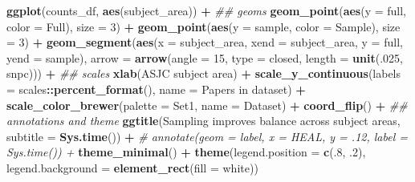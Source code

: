 \documentclass[
]{article}
\newenvironment{Shaded}{\begin{snugshade}}{\end{snugshade}}
\newcommand{\CommentTok}[1]{\textcolor[rgb]{0.56,0.35,0.01}{\textit{#1}}}
\newcommand{\DataTypeTok}[1]{\textcolor[rgb]{0.13,0.29,0.53}{#1}}
\newcommand{\DecValTok}[1]{\textcolor[rgb]{0.00,0.00,0.81}{#1}}
\newcommand{\FloatTok}[1]{\textcolor[rgb]{0.00,0.00,0.81}{#1}}
\newcommand{\KeywordTok}[1]{\textcolor[rgb]{0.13,0.29,0.53}{\textbf{#1}}}
\newcommand{\NormalTok}[1]{#1}
\newcommand{\OperatorTok}[1]{\textcolor[rgb]{0.81,0.36,0.00}{\textbf{#1}}}
\newcommand{\StringTok}[1]{\textcolor[rgb]{0.31,0.60,0.02}{#1}}
\begin{document}
\begin{Shaded}
\begin{Highlighting}[]
\KeywordTok{ggplot}\NormalTok{(counts\_df, }\KeywordTok{aes}\NormalTok{(subject\_area)) }\OperatorTok{+}\StringTok{ }
\StringTok{    }\CommentTok{\#\# geoms}
\StringTok{    }\KeywordTok{geom\_point}\NormalTok{(}\KeywordTok{aes}\NormalTok{(}\DataTypeTok{y =}\NormalTok{ full, }\DataTypeTok{color =} \StringTok{\textquotesingle{}Full\textquotesingle{}}\NormalTok{), }\DataTypeTok{size =} \DecValTok{3}\NormalTok{) }\OperatorTok{+}
\StringTok{    }\KeywordTok{geom\_point}\NormalTok{(}\KeywordTok{aes}\NormalTok{(}\DataTypeTok{y =}\NormalTok{ sample, }\DataTypeTok{color =} \StringTok{\textquotesingle{}Sample\textquotesingle{}}\NormalTok{), }\DataTypeTok{size =} \DecValTok{3}\NormalTok{) }\OperatorTok{+}
\StringTok{    }\KeywordTok{geom\_segment}\NormalTok{(}\KeywordTok{aes}\NormalTok{(}\DataTypeTok{x =}\NormalTok{ subject\_area, }\DataTypeTok{xend =}\NormalTok{ subject\_area, }
                     \DataTypeTok{y =}\NormalTok{ full, }\DataTypeTok{yend =}\NormalTok{ sample), }
                 \DataTypeTok{arrow =} \KeywordTok{arrow}\NormalTok{(}\DataTypeTok{angle =} \DecValTok{15}\NormalTok{, }\DataTypeTok{type =} \StringTok{\textquotesingle{}closed\textquotesingle{}}\NormalTok{, }
                               \DataTypeTok{length =} \KeywordTok{unit}\NormalTok{(.}\DecValTok{025}\NormalTok{, }\StringTok{\textquotesingle{}snpc\textquotesingle{}}\NormalTok{))) }\OperatorTok{+}
\StringTok{    }\CommentTok{\#\# scales}
\StringTok{    }\KeywordTok{xlab}\NormalTok{(}\StringTok{\textquotesingle{}ASJC subject area\textquotesingle{}}\NormalTok{) }\OperatorTok{+}
\StringTok{    }\KeywordTok{scale\_y\_continuous}\NormalTok{(}\DataTypeTok{labels =}\NormalTok{ scales}\OperatorTok{::}\KeywordTok{percent\_format}\NormalTok{(), }
                       \DataTypeTok{name =} \StringTok{\textquotesingle{}Papers in dataset\textquotesingle{}}\NormalTok{) }\OperatorTok{+}
\StringTok{    }\KeywordTok{scale\_color\_brewer}\NormalTok{(}\DataTypeTok{palette =} \StringTok{\textquotesingle{}Set1\textquotesingle{}}\NormalTok{, }
                       \DataTypeTok{name =} \StringTok{\textquotesingle{}Dataset\textquotesingle{}}\NormalTok{) }\OperatorTok{+}
\StringTok{    }\KeywordTok{coord\_flip}\NormalTok{() }\OperatorTok{+}\StringTok{ }
\StringTok{    }\CommentTok{\#\# annotations and theme}
\StringTok{    }\KeywordTok{ggtitle}\NormalTok{(}\StringTok{\textquotesingle{}Sampling improves balance across subject areas\textquotesingle{}}\NormalTok{, }
            \DataTypeTok{subtitle =} \KeywordTok{Sys.time}\NormalTok{()) }\OperatorTok{+}
\StringTok{    }\CommentTok{\# annotate(geom = \textquotesingle{}label\textquotesingle{}, x = \textquotesingle{}HEAL\textquotesingle{}, y = .12, label = Sys.time()) +}
\StringTok{    }\KeywordTok{theme\_minimal}\NormalTok{() }\OperatorTok{+}
\StringTok{    }\KeywordTok{theme}\NormalTok{(}\DataTypeTok{legend.position =} \KeywordTok{c}\NormalTok{(.}\DecValTok{8}\NormalTok{, }\FloatTok{.2}\NormalTok{), }
          \DataTypeTok{legend.background =} \KeywordTok{element\_rect}\NormalTok{(}\DataTypeTok{fill =} \StringTok{\textquotesingle{}white\textquotesingle{}}\NormalTok{))}
\end{Highlighting}
\end{Shaded}
\end{document}
